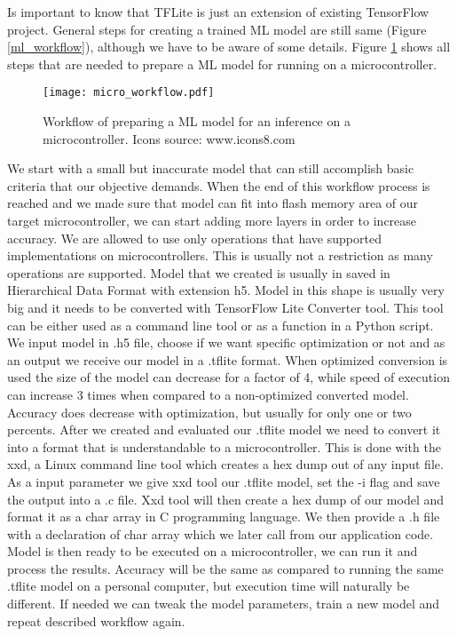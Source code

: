 Is important to know that TFLite is just an extension of existing TensorFlow project.
General steps for creating a trained ML model are still same (Figure \ref{ml_workflow}), although we have to be aware of some details.
Figure \ref{micro_workflow} shows all steps that are needed to prepare a ML model for running on a microcontroller.

\begin{figure}[ht] 
    \centering
    \texttt{[image: micro\_workflow.pdf]} 
    \caption{  Workflow of preparing a ML model for an inference on a microcontroller. Icons source: www.icons8.com}
    \label{micro_workflow}
\end{figure}

We start with a small but inaccurate model that can still accomplish basic criteria that our objective demands.
When the end of this workflow process is reached and we made sure that model can fit into flash memory area of our target microcontroller, we can start adding more layers in order to increase accuracy.
We are allowed to use only operations that have supported implementations on microcontrollers.
This is usually not a restriction as many operations are supported.
Model that we created is usually in saved in Hierarchical Data Format with extension h5.
Model in this shape is usually very big and it needs to be converted with TensorFlow Lite Converter tool.
This tool can be either used as a command line tool or as a function in a Python script.
We input model in .h5 file, choose if we want specific optimization or not and as an output we receive our model in a .tflite format.
When optimized conversion is used the size of the model can decrease for a factor of 4, while speed of execution can increase 3 times when compared to a non-optimized converted model.
Accuracy does decrease with optimization, but usually for only one or two percents.
After we created and evaluated our .tflite model we need to convert it into a format that is understandable to a microcontroller.
This is done with the xxd, a Linux command line tool which creates a hex dump out of any input file.
As a input parameter we give xxd tool our .tflite model, set the -i flag and save the output into a .c file.
Xxd tool will then create a hex dump of our model and format it as a char array in C programming language. 
We then provide a .h file with a declaration of char array which we later call from our application code.
Model is then ready to be executed on a microcontroller, we can run it and process the results.
Accuracy will be the same as compared to running the same .tflite model on a personal computer, but execution time will naturally be different.
If needed we can tweak the model parameters, train a new model and repeat described workflow again.


